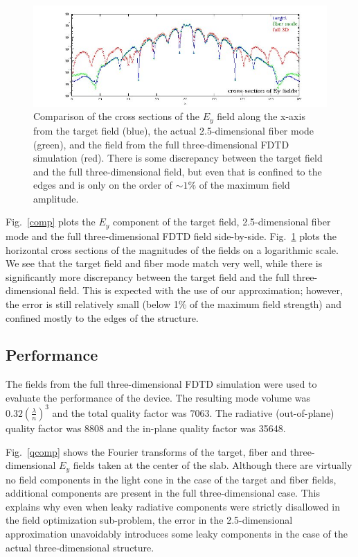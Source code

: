 \documentclass[10pt,letterpaper]{article}
\begin{document}
\begin{figure}[hbt]
\centering\includegraphics[width=\textwidth]{the_xsec}
\caption{Comparison of the cross sections of the $E_y$ field along the x-axis from the target field (blue), the actual 2.5-dimensional fiber mode (green), and the field from the full three-dimensional FDTD simulation (red). There is some discrepancy between the target field and the full three-dimensional field, but even that is confined to the edges and is only on the order of $\sim 1\%$ of the maximum field amplitude.}\label{xsec}
\end{figure}
Fig.~\ref{comp} plots the $E_y$ component of the target field, 2.5-dimensional fiber mode and the full three-dimensional FDTD field side-by-side. Fig.~\ref{xsec} plots the horizontal cross sections of the magnitudes of the fields on a logarithmic scale. We see that the target field and fiber mode match very well, while there is significantly more discrepancy between the target field and the full three-dimensional field. This is expected with the use of our approximation; however, the error is still relatively small (below 1\% of the maximum field strength) and confined mostly to the edges of the structure.

\subsection{Performance}
The fields from the full three-dimensional FDTD simulation were used to evaluate the performance of the device. The resulting mode volume was $0.32 (\frac{\lambda}{n})^3$ and the total quality factor was 7063. The radiative (out-of-plane) quality factor was 8808 and the in-plane quality factor was 35648.

Fig.~\ref{qcomp} shows the Fourier transforms of the target, fiber and three-dimensional $E_y$ fields taken at the center of the slab. Although there are virtually no field components in the light cone in the case of the target and fiber fields, additional components are present in the full three-dimensional case. This explains why even when leaky radiative components were strictly disallowed in the field optimization sub-problem, the error in the 2.5-dimensional approximation unavoidably introduces some leaky components in the case of the actual three-dimensional structure.
\end{document}
